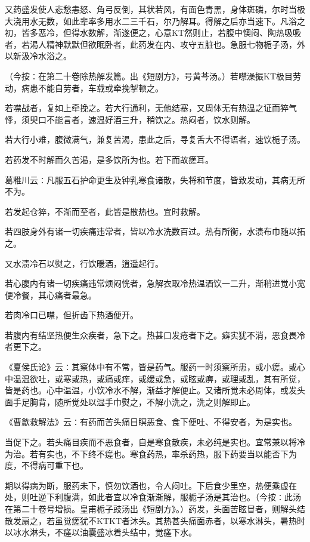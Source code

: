 \documentclass[a4paper,12pt,UTF8,twoside]{ctexbook}
\begin{document}
又药盛发使人悲愁恚怒、角弓反倒，其状若风，有面色青黑，身体斑磷，尔时当极大浇用水无数，如此辈率多用水二三千石，尔乃解耳。得解之后亦当速下。凡浴之初，皆多恶冷，但得水数解，渐遂便之，心意KT然则止，若腹中懊闷、陶热吸吸者，若渴人精神默默但欲眠卧者，此药发在内、攻守五脏也。急服七物栀子汤，外以新汲冷水浴之。

（今按∶在第二十卷除热解发篇。出《短剧方》，号黄芩汤。）若噤澡振KT极目劳动，病患不能自劳者，车载或牵挽掣顿之。

若噤战者，复如上牵挽之。若大行通利，无他结塞，又周体无有热温之证而猝气悸，须臾口不能言者，速温好酒三升，稍饮之。热闷者，饮水则解。

若大行小难，腹微满气，兼复苦渴，患此之后，寻复舌大不得语者，速饮栀子汤。

若药发不时解而久苦渴，是多饮所为也。若下而故瘥耳。

葛稚川云∶凡服五石护命更生及钟乳寒食诸散，失将和节度，皆致发动，其病无所不为。

若发起仓猝，不渐而至者，此皆是散热也。宜时救解。

若四肢身外有诸一切疾痛违常者，皆以冷水洗数百过。热有所衡，水渍布巾随以拓之。

又水渍冷石以熨之，行饮暖酒，逍遥起行。

若心腹内有诸一切疾痛违常烦闷恍者，急解衣取冷热温酒饮一二升，渐稍进觉小宽便冷餐，其心痛者最急。

若肉冷口已噤，但折齿下热酒便开。

若腹内有结坚热便生众疾者，急下之。热甚口发疮者下之。癖实犹不消，恶食畏冷者更下之。

《夏侯氏论》云∶其察体中有不常，皆是药气。服药一时须察所患，或小瘥。或心中温温欲吐，或寒或热，或痛或痒，或缓或急，或眩或痹，或理或乱，其有所觉，皆是药也。心中温温，小饮冷水不解，渐益才解便止。又诸所觉未必周体，或发头面手足胸背，随所觉处以湿手巾熨之，不解小洗之，洗之则解即止。

《曹歙救解法》云∶有药而苦头痛目瞑恶食、食下便吐、不得安者，为是实也。

当促下之。若头痛目疾而不恶食者，自是寒食散疾，未必纯是实也。宜常兼以将冷为治。若有实也，不下终不瘥也。寒食药热，率杀药热，服下药要当以能否下为度，不得病可重下也。

期以得病为断，服药未下，慎勿饮酒也，令人闷吐。下后食少里空，热便乘虚在处，则吐逆下利腹满，如此者宜以冷食渐渐解，服栀子汤是其治也。（今按∶此汤在第二十卷号增损。皇甫栀子豉汤出《短剧方》。）药发，头面苦眩冒者，则解头结散发扇之，若虽觉瘥犹不KTKT者沐头。其热甚头痛面赤者，以寒水淋头，暑热时以冰水淋头，不瘥以油囊盛冰着头结中，觉瘥下水。
\end{document}
